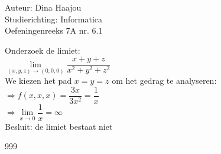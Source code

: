 \documentclass[a4paper]{article}
\begin{document}
\normalsize

\noindent \large Auteur: Dina Haajou \\
\noindent \large Studierichting: Informatica \\
\noindent \large Oefeningenreeks 7A nr. 6.1 \\

\medskip

\normalsize

Onderzoek de limiet: \\

$\lim\limits_{(x,y,z)\to(0,0,0)} \dfrac{x + y + z}{x^2 + y^2 + z^2}$ \\

We kiezen het pad $x = y = z$ om het gedrag te analyseren: \\

$\Rightarrow f(x,x,x) = \dfrac{3x}{3x^2} = \dfrac{1}{x}$ \\

$\Rightarrow \lim\limits_{x \to 0} \dfrac{1}{x} = \infty$ \\

Besluit: de limiet bestaat niet \\

\begin{thebibliography}{999}
\end{thebibliography}
\end{document}
